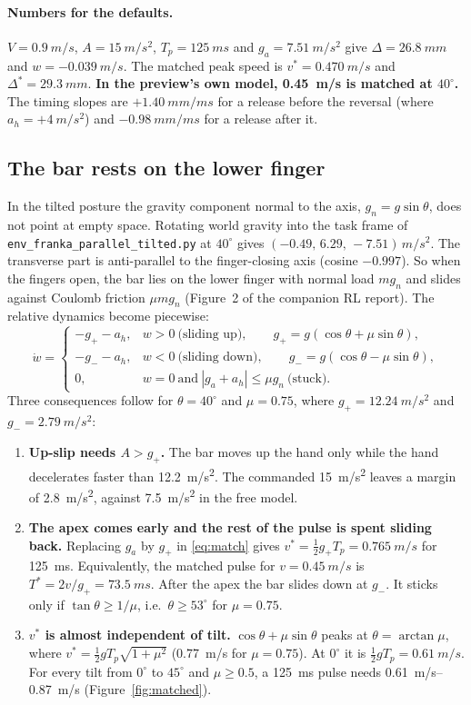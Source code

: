 \documentclass[10.5pt,a4paper]{article}
\newcommand{\code}[1]{\texttt{#1}}
\newcommand{\gp}{g_{+}}
\newcommand{\gm}{g_{-}}
\begin{document}
\paragraph{Numbers for the defaults.} $V=\SI{0.9}{m/s}$, $A=\SI{15}{m/s^2}$, $T_p=\SI{125}{ms}$ and
$g_a=\SI{7.51}{m/s^2}$ give $\Delta=\SI{26.8}{mm}$ and $w=\SI{-0.039}{m/s}$. The matched peak speed is
$v^*=\SI{0.470}{m/s}$ and $\Delta^*=\SI{29.3}{mm}$. \textbf{In the preview's own model, \SI{0.45}{m/s} is
matched at $40^\circ$.} The timing slopes are $+\SI{1.40}{mm/ms}$ for a release before the reversal (where
$a_h=+\SI{4}{m/s^2}$) and $\SI{-0.98}{mm/ms}$ for a release after it.

\subsection{The bar rests on the lower finger}
In the tilted posture the gravity component normal to the axis, $g_n=g\sin\theta$, does not point at empty
space. Rotating world gravity into the task frame of \code{env\_franka\_parallel\_tilted.py} at $40^\circ$ gives
$(-0.49,\,6.29,\,-7.51)\,\si{m/s^2}$. The transverse part is anti-parallel to the finger-closing axis
(cosine $-0.997$). So when the fingers open, the bar lies on the lower finger with normal load $m g_n$ and slides
against Coulomb friction $\mu m g_n$ (Figure~2 of the companion RL report). The relative dynamics become
piecewise:
\begin{equation}
\dot w=\begin{cases}
-\gp-a_h, & w>0\ \text{(sliding up)},\qquad \gp=g(\cos\theta+\mu\sin\theta),\\
-\gm-a_h, & w<0\ \text{(sliding down)},\qquad \gm=g(\cos\theta-\mu\sin\theta),\\
0, & w=0\ \text{and}\ |g_a+a_h|\le \mu g_n\ \text{(stuck)}.
\end{cases}\label{eq:coulomb}
\end{equation}
Three consequences follow for $\theta=40^\circ$ and $\mu=0.75$, where $\gp=\SI{12.24}{m/s^2}$ and
$\gm=\SI{2.79}{m/s^2}$:
\begin{enumerate}
\item \textbf{Up-slip needs $A>\gp$.} The bar moves up the hand only while the hand decelerates faster than
\SI{12.2}{m/s^2}. The commanded \SI{15}{m/s^2} leaves a margin of \SI{2.8}{m/s^2}, against \SI{7.5}{m/s^2} in the
free model.
\item \textbf{The apex comes early and the rest of the pulse is spent sliding back.} Replacing $g_a$ by $\gp$ in
\eqref{eq:match} gives $v^*=\tfrac12\gp T_p=\SI{0.765}{m/s}$ for \SI{125}{ms}. Equivalently, the matched pulse
for $v=\SI{0.45}{m/s}$ is $T^*=2v/\gp=\SI{73.5}{ms}$. After the apex the bar slides down at $\gm$. It sticks only
if $\tan\theta\ge1/\mu$, i.e.\ $\theta\ge53^\circ$ for $\mu=0.75$.
\item \textbf{$v^*$ is almost independent of tilt.} $\cos\theta+\mu\sin\theta$ peaks at $\theta=\arctan\mu$,
where $v^*=\tfrac12 gT_p\sqrt{1+\mu^2}$ (\SI{0.77}{m/s} for $\mu=0.75$). At $0^\circ$ it is
$\tfrac12 gT_p=\SI{0.61}{m/s}$. For every tilt from $0^\circ$ to $45^\circ$ and $\mu\ge0.5$, a \SI{125}{ms}
pulse needs \SIrange{0.61}{0.87}{m/s} (Figure~\ref{fig:matched}).
\end{enumerate}
\end{document}
